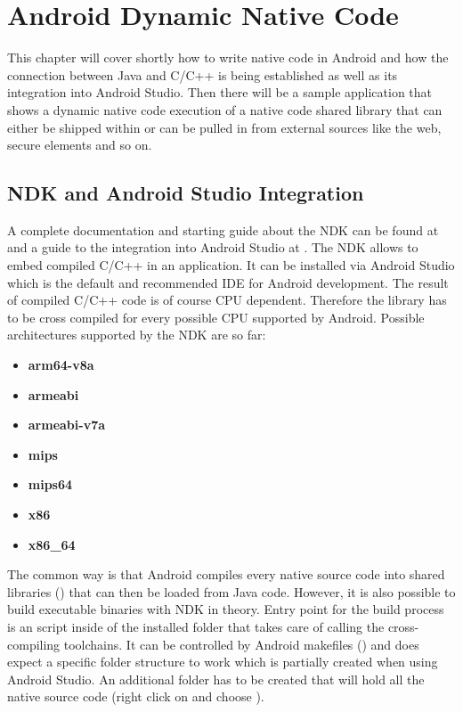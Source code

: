 \chapter{Android Dynamic Native Code}\label{chapter:android_dynamic_native_code}

This chapter will cover shortly how to write native code in Android and how
the connection between Java and C/C++ is being established as well as its
integration into Android Studio.
Then there will be a sample application that shows a dynamic native code execution of a native code shared library that can either be shipped within  or can be pulled in from external sources like the web, secure elements and so on.

\section{NDK and Android Studio Integration}\label{section:ndk_integration}
A complete documentation and starting guide about the NDK can be found at \parencite{ndk} and a guide to the integration into Android Studio at \parencite{ndk_integration}.
The NDK allows to embed compiled C/C++ in an application. It can be installed via Android Studio which is the default and recommended IDE for Android development.
The result of compiled C/C++ code is of course CPU dependent. Therefore the library has to be cross compiled for 
every possible CPU supported by Android. Possible architectures supported by the NDK are so far:
\begin{itemize}
\item \textbf{arm64-v8a}
\item \textbf{armeabi}
\item \textbf{armeabi-v7a}
\item \textbf{mips}
\item \textbf{mips64}
\item \textbf{x86}
\item \textbf{x86\_64}
\end{itemize}
The common way is that Android compiles every native source code into shared libraries
() that can then be loaded from Java code. However, it is also possible to build executable binaries with NDK in theory. Entry point for the build process is an  script inside of the installed  folder that takes care of calling the cross-compiling toolchains. It can be controlled by Android makefiles () and does 
expect a specific folder structure to work which is partially created when using Android Studio. An additional  folder has to be created that will hold all the native source code (right click on  and choose ). 

